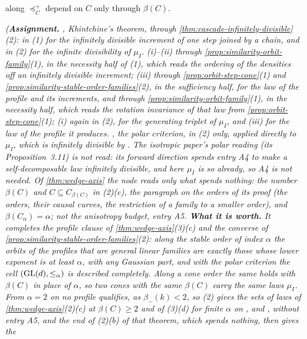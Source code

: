 \begin{proposition}
\begin{enumerate}
along $\preceq^+_C$ depend on $C$ only through $\beta(C)$.
\end{enumerate}
\statusA\quad{}\quad{}\quad{}\quad\emph{(\textbf{Assignment.} ,
Khintchine's theorem, through \ref{thm:cascade-infinitely-divisible}(2): in (1) for the infinitely divisible
increment of one step joined by a chain, and in (2) for the infinite divisibility of $\mu_I$.
(i)--(ii) through \ref{prop:similarity-orbit-family}(1), in the necessity half of (1), which reads
the ordering of the \Levy{} densities off an infinitely divisible increment; (iii) through
\ref{prop:orbit-step-cone}(1) and \ref{prop:similarity-stable-order-families}(2), in the sufficiency half, for
the law of the profile and its increments, and through \ref{prop:similarity-orbit-family}(1), in the necessity
half, which reads the rotation invariance of that law from \ref{prop:orbit-step-cone}(1); (i) again in
(2), for the generating triplet of $\mu_I$, and (iii) for the law of the profile it produces.
, the polar criterion, in (2) only, applied directly to $\mu_I$, which is infinitely divisible by
. The isotropic paper's polar reading (its Proposition~3.11) is not read: its forward direction
spends entry A4 to make a self-decomposable law infinitely divisible, and here $\mu_I$ is so already, so A4
is not needed. Of \ref{thm:wedge-axis} the node reads only what spends nothing:
the number $\beta(C)$ and $C \subseteq C_{\beta(C)}$ in (2)(c), the paragraph on the orders of its proof
(the orders, their causal curves, the restriction of a family to a smaller order), and
$\beta(C_\alpha) = \alpha$; not the anisotropy budget, entry A5. \textbf{What it is worth.} It completes the
profile clause of \ref{thm:wedge-axis}(3)(c) and the converse of \ref{prop:similarity-stable-order-families}(2):
along the stable order of index $\alpha$ the orbits of the profiles that are general linear families are
exactly those whose lower exponent is at least $\alpha$, with any Gaussian part, and with the polar
criterion the cell $(\mathrm{GL}(d), \le_\alpha)$ is described completely. Along a cone order the same holds with
$\beta(C)$ in place of $\alpha$, so two cones with the same $\beta(C)$ carry the same laws $\mu_I$. From
$\alpha = 2$ on no profile qualifies, as $\beta_-(k) < 2$, so (2) gives the sets of laws of
\ref{thm:wedge-axis}(2)(c) at $\beta(C) \ge 2$ and of (3)(d) for finite $\alpha$ on ,  and
, without entry A5, and the end of (2)(b) of that theorem, which spends nothing, then gives the
}
\end{proposition}
